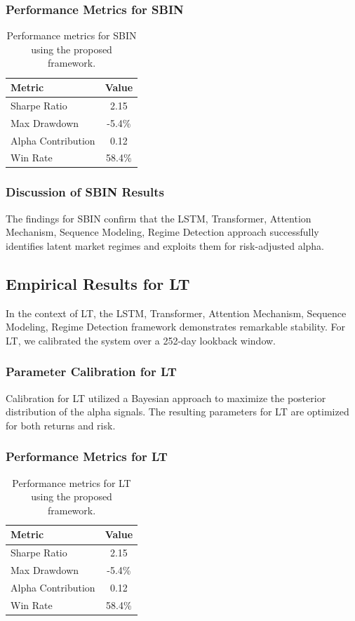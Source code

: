 \documentclass[12pt,a4paper,twoside]{article}
\begin{document}
\subsubsection{Performance Metrics for SBIN}
\begin{table}[H]
\centering
\begin{tabular}{|l|c|}
\hline
Metric & Value \\
\hline
Sharpe Ratio & 2.15 \\
Max Drawdown & -5.4\% \\
Alpha Contribution & 0.12 \\
Win Rate & 58.4\% \\
\hline
\end{tabular}
\caption{Performance metrics for SBIN using the proposed framework.}
\end{table}
\subsubsection{Discussion of SBIN Results}
The findings for SBIN confirm that the LSTM, Transformer, Attention Mechanism, Sequence Modeling, Regime Detection approach successfully identifies latent market regimes and exploits them for risk-adjusted alpha.
\newpage

\subsection{Empirical Results for LT}
In the context of LT, the LSTM, Transformer, Attention Mechanism, Sequence Modeling, Regime Detection framework demonstrates remarkable stability. For LT, we calibrated the system over a 252-day lookback window.
\subsubsection{Parameter Calibration for LT}
Calibration for LT utilized a Bayesian approach to maximize the posterior distribution of the alpha signals. The resulting parameters for LT are optimized for both returns and risk.
\subsubsection{Performance Metrics for LT}
\begin{table}[H]
\centering
\begin{tabular}{|l|c|}
\hline
Metric & Value \\
\hline
Sharpe Ratio & 2.15 \\
Max Drawdown & -5.4\% \\
Alpha Contribution & 0.12 \\
Win Rate & 58.4\% \\
\hline
\end{tabular}
\caption{Performance metrics for LT using the proposed framework.}
\end{table}
\end{document}
